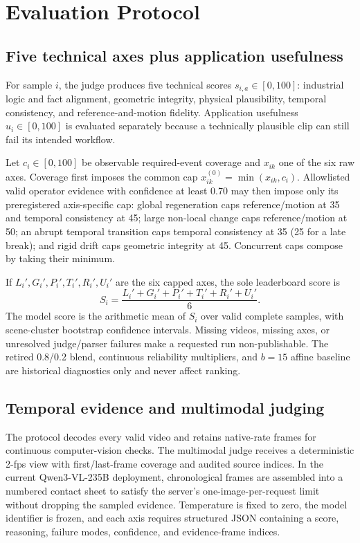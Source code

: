 \section{Evaluation Protocol}
\label{sec:evaluation}



\subsection{Five technical axes plus application usefulness}

For sample $i$, the judge produces five technical scores $s_{i,a}\in[0,100]$: industrial logic and fact alignment, geometric integrity, physical plausibility, temporal consistency, and reference-and-motion fidelity. Application usefulness $u_i\in[0,100]$ is evaluated separately because a technically plausible clip can still fail its intended workflow.

Let $c_i\in[0,100]$ be observable required-event coverage and $x_{ik}$ one of the six raw axes. Coverage first imposes the common cap $x^{(0)}_{ik}=\min(x_{ik},c_i)$. Allowlisted valid operator evidence with confidence at least 0.70 may then impose only its preregistered axis-specific cap: global regeneration caps reference/motion at 35 and temporal consistency at 45; large non-local change caps reference/motion at 50; an abrupt temporal transition caps temporal consistency at 35 (25 for a late break); and rigid drift caps geometric integrity at 45. Concurrent caps compose by taking their minimum.

If $L_i',G_i',P_i',T_i',R_i',U_i'$ are the six capped axes, the sole leaderboard score is
\begin{equation}
S_i=\frac{L_i'+G_i'+P_i'+T_i'+R_i'+U_i'}{6}.
\end{equation}
The model score is the arithmetic mean of $S_i$ over valid complete samples, with scene-cluster bootstrap confidence intervals. Missing videos, missing axes, or unresolved judge/parser failures make a requested run non-publishable. The retired 0.8/0.2 blend, continuous reliability multipliers, and $b=15$ affine baseline are historical diagnostics only and never affect ranking.

\subsection{Temporal evidence and multimodal judging}

The protocol decodes every valid video and retains native-rate frames for continuous computer-vision checks. The multimodal judge receives a deterministic 2-fps view with first/last-frame coverage and audited source indices. In the current Qwen3-VL-235B deployment, chronological frames are assembled into a numbered contact sheet to satisfy the server's one-image-per-request limit without dropping the sampled evidence. Temperature is fixed to zero, the model identifier is frozen, and each axis requires structured JSON containing a score, reasoning, failure modes, confidence, and evidence-frame indices.

